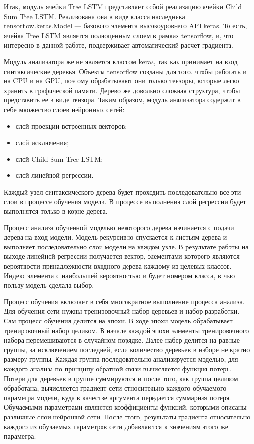 Итак, модуль ячейки Tree LSTM представляет собой реализацию ячейки Child Sum Tree LSTM. Реализована она в виде класса наследника tensorflow.keras.Model --- базового элемента высокоуровнего API keras. То есть, ячейка Tree LSTM является полноценным слоем в рамках tensorflow, и, что интересно в данной работе, поддерживает автоматический расчет градиента.

Модуль анализатора же не является классом keras, так как принимает на вход синтаксические деревья. Объекты tensorflow созданы для того, чтобы работать и на CPU и на GPU, поэтому обрабатывают они только тензоры, которые легко хранить в графической памяти. Дерево же довольно сложная структура, чтобы представить ее в виде тензора. Таким образом, модуль анализатора содержит в себе множество слоев нейронных сетей:

\begin{itemize}
\item слой проекции встроенных векторов;
\item слой исключения;
\item слой Child Sum Tree LSTM;
\item слой линейной регрессии.
\end{itemize}

Каждый узел синтаксического дерева будет проходить последовательно все эти слои в процессе обучения модели. В процессе выполнения слой регрессии будет выполнятся только в корне дерева.

Процесс анализа обученной моделью некоторого дерева начинается с подачи дерева на вход модели. Модель рекурсивно спускается к листьям дерева и выполняет последовательно слои модели на каждом узле. В результате работы на выходе линейной регрессии получается вектор, элементами которого являются вероятности принадлежности входного дерева каждому из целевых классов. Индекс элемента с наибольшей вероятностью и будет номером класса, в чью пользу модель сделала выбор.

Процесс обучения включает в себя многократное выполнение процесса анализа. Для обучения сети нужны тренировочный набор деревьев и набор разработки. Сам процесс обучения делится на эпохи. В ходе эпохи модель обрабатывает тренировочный набор целиком. В начале каждой эпохи элементы тренировочного набора перемешиваются в случайном порядке. Далее набор делится на равные группы, за исключением последней, если количество деревьев в наборе не кратно размеру группы. Каждая группа последовательно анализируется моделью, для каждого анализа по принципу обратной связи вычисляется функция потерь. Потери для деревьев в группе суммируются и после того, как группа целиком обработана, вычисляется градиент сети относительно каждого обучаемого параметра модели, куда в качестве аргумента передается суммарная потеря. Обучаемыми параметрами являются коэффициенты функций, которыми описаны различные слои нейронной сети. После этого, результаты градиента относительно каждого из обучаемых параметров сети добавляются к значениям этого же параметра.


